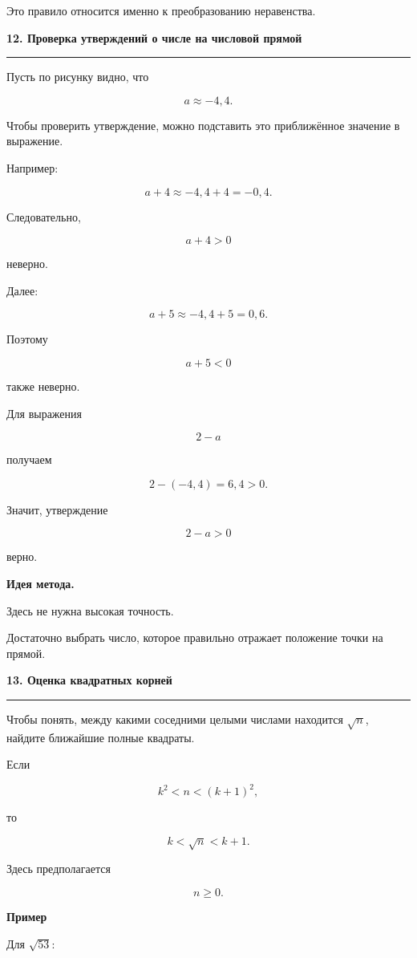 \documentclass[a4paper,12pt]{article}
\newcommand{\topic}[1]{%
    \par\vspace{0.9em}%
    {\Large\bfseries\color{darkaccent}#1}\par
    \vspace{0.25em}
    \noindent
    \color{accent}\rule{\linewidth}{0.6pt}
    \color{black}
    \vspace{0.55em}
}
\newcommand{\subtopic}[1]{%
    \par\vspace{0.55em}%
    {\large\bfseries\color{textgray}#1}\par
    \vspace{0.2em}
}
\newcommand{\important}[1]{%
    \textbf{\color{darkaccent}#1}%
}
\begin{document}
Это правило относится именно к преобразованию неравенства.


\topic{12. Проверка утверждений о числе на числовой прямой}

Пусть по рисунку видно, что

\[
a\approx-4{,}4.
\]

Чтобы проверить утверждение, можно подставить это приближённое
значение в выражение.

Например:

\[
a+4\approx-4{,}4+4=-0{,}4.
\]

Следовательно,

\[
a+4>0
\]

неверно.

Далее:

\[
a+5\approx-4{,}4+5=0{,}6.
\]

Поэтому

\[
a+5<0
\]

также неверно.

Для выражения

\[
2-a
\]

получаем

\[
2-(-4{,}4)=6{,}4>0.
\]

Значит, утверждение

\[
2-a>0
\]

верно.

\important{Идея метода.}
Здесь не нужна высокая точность.

Достаточно выбрать число, которое правильно отражает
положение точки на прямой.


\topic{13. Оценка квадратных корней}

Чтобы понять, между какими соседними целыми числами находится
$\sqrt n$, найдите ближайшие полные квадраты.

Если

\[
k^2<n<(k+1)^2,
\]

то

\[
k<\sqrt n<k+1.
\]

Здесь предполагается

\[
n\ge0.
\]

\subtopic{Пример}

Для $\sqrt{53}$:
\end{document}
